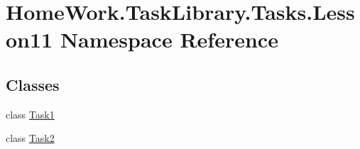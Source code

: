 \hypertarget{namespace_home_work_1_1_task_library_1_1_tasks_1_1_lesson11}{}\section{Home\+Work.\+Task\+Library.\+Tasks.\+Lesson11 Namespace Reference}
\label{namespace_home_work_1_1_task_library_1_1_tasks_1_1_lesson11}
\subsection*{Classes}
\begin{DoxyCompactItemize}
\item 
class \mbox{\hyperlink{class_home_work_1_1_task_library_1_1_tasks_1_1_lesson11_1_1_task1}{Task1}}
\item 
class \mbox{\hyperlink{class_home_work_1_1_task_library_1_1_tasks_1_1_lesson11_1_1_task2}{Task2}}
\end{DoxyCompactItemize}
